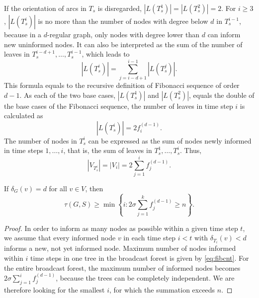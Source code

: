 If the orientation of arcs in $T_s$ is disregarded, $|L(T^1_s)|=|L(T^2_s)|=2$.
For $i\geq 3$, $|L(T^i_s)|$ is no more than the number of nodes with degree below $d$ in $T^{i-1}_s$, 
because in a $d$-regular graph, only nodes with degree lower than $d$ can inform new uninformed nodes.
It can also be interpreted as the sum of the number of leaves in $T^{i-d+1}_s,\dots,T^{i-1}_s$, which leads to %
\begin{equation*}
\label{eq:leafrec}
|L(T^i_s)|=\sum\limits_{j=i-d+1}^{i-1} |L(T^j_s)|.
\end{equation*}  
This formula equals to the recursive definition of Fibonacci sequence of order $d-1$.
As each of the two base cases, $|L(T^1_s)|$ and $|L(T^2_s)|$, equals the double of the base cases of the Fibonacci sequence, the number of leaves in time step $i$ is calculated as
\begin{equation*}
\label{eq:fibleaf}
|L(T^i_s)|=2 f^{(d-1)}_i.
\end{equation*}  
The number of nodes in $T^i_s$ can be expressed as the sum of nodes newly informed in time steps $1,\dots,i$, that is, the sum of leaves in $T^1_s,\dots,T^i_s$. Thus,
\begin{equation}
\label{eq:fibcnt}
|V_{T^i_s}|=|V_i|=2\sum\limits_{j=1}^i f^{(d-1)}_j.
\end{equation}

\begin{proposition}
	If $\delta_G(v)=d$ for all $v\in V$, then 
\begin{equation*}
\label{lem:lbreg1}
	\tau(G,S)\geq\min\left\{i:2\sigma\sum\limits_{j=1}^kf^{(d-1)}_j\geq n\right\}.
\end{equation*}
\label{prop:lbfib}
\end{proposition}
\begin{proof}
In order to inform as many nodes as possible within a given time step $t$,
we assume that every informed node $v$ in each time step $i<t$ with $\delta_{T_i}(v)<d$ informs a new, not yet informed node.
Maximum number of nodes informed within $i$ time steps in one tree in the broadcast forest is given by \eqref{eq:fibcnt}.
For the entire broadcast forest, the maximum number of informed nodes becomes $2\sigma\sum\limits_{j=1}^i f^{(d-1)}_j$, because the trees can be completely independent.
We are therefore looking for the smallest $i$, for which the summation exceeds $n$.
\end{proof}

